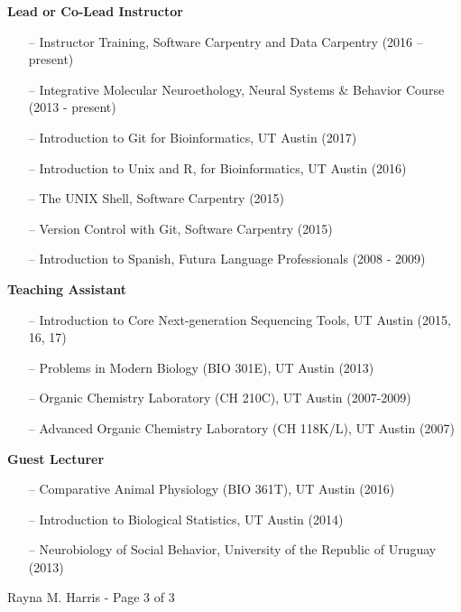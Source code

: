\documentclass[margin,line]{resume}
\begin{document}
\begin{resume}
\begin{itemize}
\end{itemize}

{\bf Lead or Co-Lead Instructor }
\begin{itemize}
\raggedright
\item[--] Instructor Training, Software Carpentry and Data Carpentry (2016 – present)
\item[--] Integrative Molecular Neuroethology, Neural Systems \& Behavior Course (2013 - present)
\item[--] Introduction to Git for Bioinformatics, UT Austin (2017)
\item[--] Introduction to Unix and R, for Bioinformatics, UT Austin (2016)
\item[--] The UNIX Shell, Software Carpentry (2015)
\item[--] Version Control with Git, Software Carpentry (2015)
\item[--] Introduction to Spanish, Futura Language Professionals (2008 - 2009)
\end{itemize}

{\bf Teaching Assistant}
\begin{itemize}
\item[--] Introduction to Core Next-generation Sequencing Tools, UT Austin (2015, 16, 17)
\item[--] Problems in Modern Biology (BIO 301E), UT Austin (2013)
\item[--] Organic Chemistry Laboratory (CH 210C), UT Austin (2007-2009)
\item[--] Advanced Organic Chemistry Laboratory (CH 118K/L), UT Austin (2007)
\end{itemize}

{\bf Guest Lecturer}
\begin{itemize}
\item[--] Comparative Animal Physiology (BIO 361T), UT Austin (2016)
\item[--] Introduction to Biological Statistics, UT Austin (2014)
\item[--] Neurobiology of Social Behavior, University of the Republic of Uruguay (2013)
\end{itemize}




\vspace{0.5 cm}
{\centerline {Rayna M. Harris - Page 3 of 3}}

\end{resume}
\end{document}

